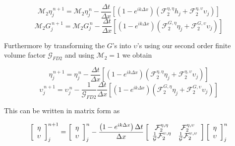 	\begin{equation*}
\mathcal{M}_2 \eta^{\,n + 1}_{j} = \mathcal{M}_2 \eta^{\,n }_{j} - \frac{\Delta t}{\Delta x}  \left[ \left(1 - e^{ik\Delta x}\right) \left(\mathcal{F}_2^{\eta,\eta} h_{j}  + \mathcal{F}_2^{\eta,\upsilon} \upsilon_j \right) \right]
	\end{equation*}
	\begin{equation*}
\mathcal{M}_2 G^{\,n + 1}_{j} = \mathcal{M}_2 G^{\,n }_{j} - \frac{\Delta t}{\Delta x}  \left[ \left(1 - e^{ik\Delta x}\right) \left(  \mathcal{F}_2^{G,\eta} \eta_{j}  + \mathcal{F}_2^{G,\upsilon} \upsilon_j \right) \right]
	\end{equation*}
	
Furthermore by transforming the $G$'s into $\upsilon$'s using our second order finite volume factor $\mathcal{G}_{FD2}$ and using $\mathcal{M}_2 = 1$ we obtain
	
	
\begin{equation*}
\eta^{\,n + 1}_{j} = \eta^{\,n }_{j} - \frac{\Delta t}{\Delta x}  \left[ \left(1 - e^{ik\Delta x}\right) \left(\mathcal{F}_2^{\eta,\eta} \eta_{j}  + \mathcal{F}_2^{\eta,\upsilon} \upsilon_j \right) \right]
\end{equation*}
\begin{equation*}
\upsilon^{\,n + 1}_{j} = \upsilon^{\,n }_{j} -  \frac{1}{\mathcal{G}_{FD2}}\frac{\Delta t}{\Delta x}  \left[ \left(1 - e^{ik\Delta x}\right) \left(  \mathcal{F}_2^{G,\eta} \eta_{j}  + \mathcal{F}_2^{G,\upsilon} \upsilon_j \right) \right]
\end{equation*}

This can be written in matrix form as

\begin{equation*}
\left[\begin{array}{c}
\eta \\ \upsilon
\end{array}\right]^{n+1}_j = \left[\begin{array}{c}
\eta \\ \upsilon
\end{array}\right]^{n}_j - \frac{\left(1 - e^{ik\Delta x}\right) \Delta t}{\Delta x}\left[\begin{array}{c c}
\mathcal{F}_2^{\eta,\eta} & \mathcal{F}_2^{\eta,\upsilon} \\ \frac{1}{\mathcal{G}}\mathcal{F}_2^{\upsilon,\eta} &  \frac{1}{\mathcal{G}}\mathcal{F}_2^{\upsilon,\upsilon} 
\end{array}\right]\left[\begin{array}{c}
\eta \\ \upsilon
\end{array}\right]^{n}_j
\end{equation*}

